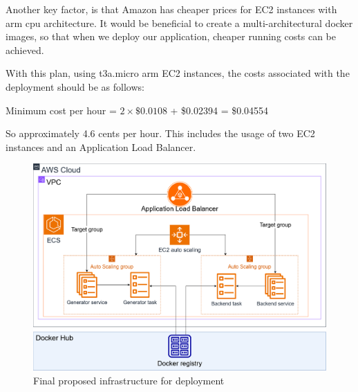 		Another key factor, is that Amazon has cheaper prices for EC2 instances with arm cpu architecture. It would be beneficial
		to create a multi-architectural docker images, so that when we deploy our application, cheaper running costs can be 
		achieved.

		With this plan, using t3a.micro arm EC2 instances, the costs associated with the deployment should be as follows:
		
		\begin{center}
			Minimum cost per hour = $2 \times \$0.0108$ + \$0.02394 = \$0.04554
		\end{center}

		So approximately 4.6 cents per hour. This includes the usage of two EC2 instances and an Application Load Balancer.

		\begin{figure}[h!]
			\begin{center}
				\includegraphics[scale=0.35]{include/imgs/aws_infra_plan.png}
				\caption{Final proposed infrastructure for deployment}
				\label{infraplan}
			\end{center}
		\end{figure}